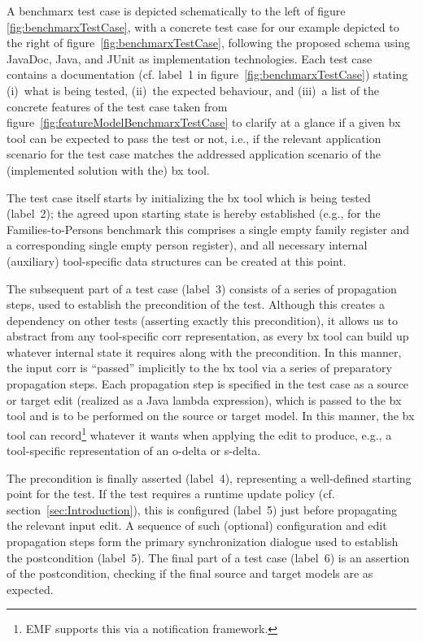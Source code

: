 A benchmarx test case is depicted schematically to the left of figure \ref{fig:benchmarxTestCase}, with a concrete test case for our example depicted to the right of figure~\ref{fig:benchmarxTestCase}, following the proposed schema using JavaDoc, Java, and JUnit as implementation technologies.
Each test case contains a documentation (cf. label~1 in figure~\ref{fig:benchmarxTestCase}) stating (i)~what is being tested, (ii)~the expected behaviour, and (iii)~a list of the concrete features of the test case taken from figure~\ref{fig:featureModelBenchmarxTestCase} to clarify at a glance if a given bx tool can be expected to pass the test or not, i.e., if the relevant application scenario for the test case matches the addressed application scenario of the (implemented solution with the) bx tool. 

The test case itself starts by initializing the bx tool which is being tested (label~2); the agreed upon starting state is hereby established (e.g., for the Families-to-Persons benchmark this comprises a single empty family register and a corresponding single empty person register), and all necessary internal (auxiliary) tool-specific data structures can be created at this point.


The subsequent part of a test case (label~3) consists of a series of propagation steps, used to establish the precondition of the test. 
Although this creates a dependency on other tests (asserting exactly this precondition), it allows us to abstract from any tool-specific corr representation, as every bx tool can build up whatever internal state it requires along with the precondition. 
In this manner, the input corr is ``passed'' implicitly to the bx tool via a series of preparatory propagation steps.
Each propagation step is specified in the test case as a source or target edit (realized as a Java lambda expression), which is passed to the bx tool and is to be performed on the source or target model.
In this manner, the bx tool can record\footnote{EMF supports this via a notification framework.} whatever it wants when applying the edit to produce, e.g., a tool-specific representation of an o-delta or s-delta.

The precondition is finally asserted (label~4), representing a well-defined starting point for the test. 
If the test requires a runtime update policy (cf. section~\ref{sec:Introduction}), this is configured (label~5) just before propagating the relevant input edit.
A sequence of such (optional) configuration and edit propagation steps form the primary synchronization dialogue used to establish the postcondition (label~5).
The final part of a test case (label~6) is an assertion of the postcondition, checking if the final source and target models are as expected. 



